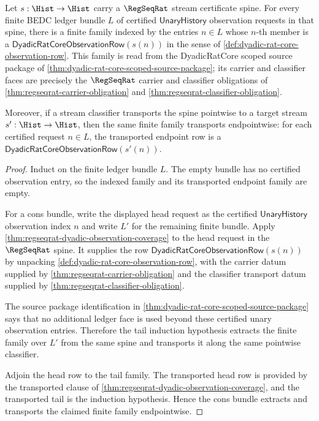 \begin{theorem}
\label{thm:dyadic-rat-core-observation-row-finite-ledger-extraction}
Let $s:\Hist\to\Hist$ carry a $\RegSeqRat$ stream certificate spine. For every
finite BEDC ledger bundle $L$ of certified $\mathsf{UnaryHistory}$ observation
requests in that spine, there is a finite family indexed by the entries
$n\in L$ whose $n$-th member is a
$\mathsf{DyadicRatCoreObservationRow}(s(n))$ in the sense of
\autoref{def:dyadic-rat-core-observation-row}. This family is read from the
DyadicRatCore scoped source package of
\autoref{thm:dyadic-rat-core-scoped-source-package}; its carrier and classifier
faces are precisely the $\RegSeqRat$ carrier and classifier obligations of
\autoref{thm:regseqrat-carrier-obligation} and
\autoref{thm:regseqrat-classifier-obligation}.

Moreover, if a stream classifier transports the spine pointwise to a target
stream $s':\Hist\to\Hist$, then the same finite family transports endpointwise:
for each certified request $n\in L$, the transported endpoint row is a
$\mathsf{DyadicRatCoreObservationRow}(s'(n))$.
\end{theorem}
\begin{proof}
Induct on the finite ledger bundle $L$. The empty bundle has no certified
observation entry, so the indexed family and its transported endpoint family
are empty.

For a cons bundle, write the displayed head request as the certified
$\mathsf{UnaryHistory}$ observation index $n$ and write $L'$ for the remaining
finite bundle. Apply
\autoref{thm:regseqrat-dyadic-observation-coverage} to the head request in the
$\RegSeqRat$ spine. It supplies the row
$\mathsf{DyadicRatCoreObservationRow}(s(n))$ by unpacking
\autoref{def:dyadic-rat-core-observation-row}, with the carrier datum supplied
by \autoref{thm:regseqrat-carrier-obligation} and the classifier transport
datum supplied by \autoref{thm:regseqrat-classifier-obligation}.

The source package identification in
\autoref{thm:dyadic-rat-core-scoped-source-package} says that no additional
ledger face is used beyond these certified unary observation entries. Therefore
the tail induction hypothesis extracts the finite family over $L'$ from the
same spine and transports it along the same pointwise classifier.

Adjoin the head row to the tail family. The transported head row is provided by
the transported clause of
\autoref{thm:regseqrat-dyadic-observation-coverage}, and the transported tail is
the induction hypothesis. Hence the cons bundle extracts and transports the
claimed finite family endpointwise.
\end{proof}

